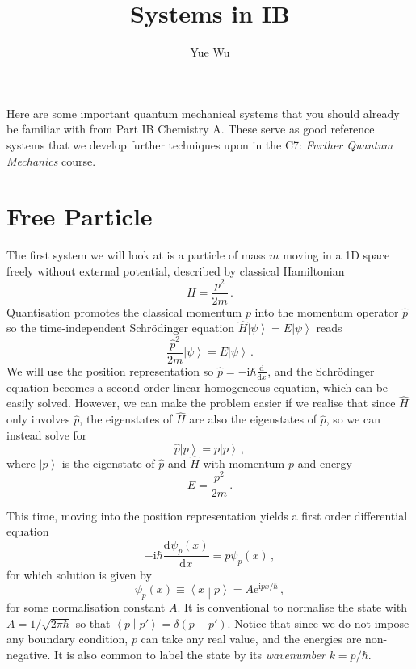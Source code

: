 \documentclass{article}
\title{Systems in IB}
\author{Yue Wu}
\theoremstyle{plain}\theoremheaderfont{\normalfont\itshape}\theorembodyfont{\rmfamily}\theoremseparator{.}\newtheorem*{rem}{Remark}\newtheorem*{ex}{Example}\newtheorem*{proof}{Proof}\newtheorem*{altp}{Alternative proof}
\theoremstyle{plain}\theoremheaderfont{\normalfont\bfseries}\theorembodyfont{\rmfamily}\theoremseparator{.}\newtheorem{thm}{Theorem}[section]\newtheorem{lem}[thm]{Lemma}\newtheorem{prop}[thm]{Proposition}\newtheorem*{cor}{Corollary}\newtheorem{defn}[thm]{Definition}\newtheorem{clm}[thm]{Claim}\newtheorem{clminproof}{Claim}
\theoremstyle{break}\theoremheaderfont{\normalfont\itshape}\theorembodyfont{\rmfamily}\theoremseparator{.\medskip}\newtheorem*{proofskip}{Proof}\newtheorem*{exs}{Examples}\newtheorem*{rems}{Remarks}
\theoremstyle{break}\theoremheaderfont{\normalfont\bfseries}\theorembodyfont{\rmfamily}\theoremseparator{.\medskip}\newtheorem{lemskip}[thm]{Lemma}\newtheorem{defnskip}[thm]{Definition}\newtheorem{propskip}[thm]{Proposition}\newtheorem{thmskip}[thm]{Theorem}
\numberwithin{equation}{section}
\newcommand{\ii}{\mathrm{i}}
\newcommand{\ee}{\mathrm{e}}
\newcommand{\dv}[3][]{\frac{\mathrm{d}^{#1} #2}{{\mathrm{d} #3}^{#1}}}
\newcommand{\ket}[1]{\left| #1 \right\rangle}
\newcommand{\braket}[2]{\left\langle #1 \middle| #2 \right\rangle}
\begin{document}
    Here are some important quantum mechanical systems that you should already be familiar with from Part IB Chemistry A. These serve as good reference systems that we develop further techniques upon in the C7: \textit{Further Quantum Mechanics} course.

    \section{Free Particle}
    The first system we will look at is a particle of mass \(m\) moving in a 1D space freely without external potential, described by classical Hamiltonian
    \begin{equation}
        H=\frac{p^2}{2m}\,.
    \end{equation}
    Quantisation promotes the classical momentum \(p\) into the momentum operator \(\hat{p}\) so the time-independent Schr\"{o}dinger equation \(\hat{H}\ket{\psi}=E\ket{\psi}\) reads
    \begin{equation}
        \frac{\hat{p}^2}{2m}\ket{\psi}=E\ket{\psi}\,.
    \end{equation}
    We will use the position representation so \(\hat{p}=-\ii\hbar\dv{}{x}\), and the Schr\"{o}dinger equation becomes a second order linear homogeneous equation, which can be easily solved. However, we can make the problem easier if we realise that since \(\hat{H}\) only involves \(\hat{p}\), the eigenstates of \(\hat{H}\) are also the eigenstates of \(\hat{p}\), so we can instead solve for
    \begin{equation}
        \hat{p}\ket{p}=p\ket{p}\,,
    \end{equation}
    where \(\ket{p}\) is the eigenstate of \(\hat{p}\) and \(\hat{H}\) with momentum \(p\) and energy
    \begin{equation}
        E=\frac{p^2}{2m}\,.
    \end{equation}

    This time, moving into the position representation yields a first order differential equation
    \begin{equation}
        -\ii\hbar\dv{\psi_p(x)}{x}=p\psi_p(x)\,,
    \end{equation}
    for which solution is given by
    \begin{equation}
        \psi_p(x)\equiv\braket{x}{p}=A\ee^{\ii px/\hbar}\,,
    \end{equation}
    for some normalisation constant \(A\). It is conventional to normalise the state with \(A=1/\sqrt{2\pi\hbar}\) so that \(\braket{p}{p'}=\delta(p-p')\). Notice that since we do not impose any boundary condition, \(p\) can take any real value, and the energies are non-negative. It is also common to label the state by its \textit{wavenumber} \(k=p/\hbar\).
    
\end{document}

